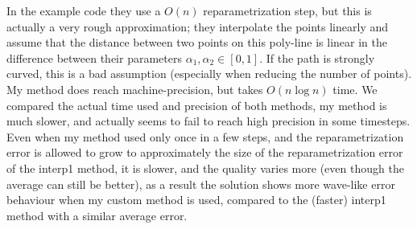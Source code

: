 In the example code they use a $O(n)$ reparametrization step, but this is actually a very rough approximation; they interpolate the points linearly and assume that the distance between two points on this poly-line is linear in the difference between their parameters $\alpha_1, \alpha_2\in[0,1]$. If the path is strongly curved, this is a bad assumption (especially when reducing the number of points). My method does reach machine-precision, but takes $O(n\log n)$ time. We compared the actual time used and precision of both methods, my method is much slower, and actually seems to fail to reach high precision in some timesteps. Even when my method used only once in a few steps, and the reparametrization error is allowed to grow to approximately the size of the reparametrization error of the interp1 method, it is slower, and the quality varies more (even though the average can still be better), as a result the solution shows more wave-like error behaviour when my custom method is used, compared to the (faster) interp1 method with a similar average error.




